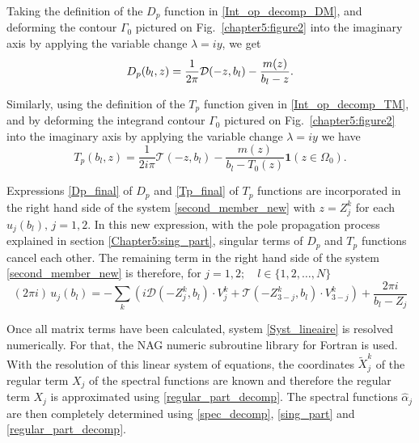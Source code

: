Taking the definition of the $D_p$ function in \eqref{Int_op_decomp_DM}, and deforming the contour $\Gamma_0$ pictured on Fig.~\ref{chapter5:figure2} into the imaginary axis by applying the variable change $\lambda = iy$, we get
\begin{equation}
\label{Dp_final}
D_p(b_l,z) = {1\over 2\pi}\mathcal D(-z,b_l)-  {m(z)\over b_l-z}.
\end{equation}

Similarly, using the definition of the $T_p$ function given in \eqref{Int_op_decomp_TM}, and by deforming the integrand contour $\Gamma_0$ pictured on Fig.~\ref{chapter5:figure2} into the imaginary axis by applying the variable change $\lambda = iy$ we have
\begin{equation}
\label{Tp_final}
T_p(b_l,z) = 
\dfrac{1}{2i\pi} \mathcal T(-z,b_l) - \dfrac{m(z)}{b_l - T_0(z)} \mathbf{1} (z \in \Omega_0) .
\end{equation}

Expressions \eqref{Dp_final} of $D_p$ and \eqref{Tp_final} of $T_p$ functions are incorporated in the right hand side of the system \eqref{second_member_new} with $z = Z_j^k$ for each $u_j(b_l), \, j=1,2$. In this new expression, with the pole propagation process explained in section \ref{Chapter5:sing_part}, singular terms of $D_p$ and $T_p$ functions cancel each other. The remaining term in the right hand side of the system \eqref{second_member_new} is therefore, for $j=1,2; \quad l \in \{ 1,2, \ldots, N \}$
\begin{equation}
(2\pi i) \, u_j(b_l) =  - \sum_k \left( i \mathcal D(-Z_j^k,b_l)\cdot V_j^k  + \mathcal T(-Z_{3-j}^k,b_l) 
\cdot V_{3-j}^k  \right) +  \dfrac{2\pi i}{b_l - Z_j}
\end{equation}

Once all matrix terms have been calculated, system \eqref{Syst_lineaire} is resolved numerically. For that, the NAG numeric subroutine library for Fortran is used. With the resolution of this linear system of equations, the coordinates $\tilde{X}_j^k$ of the regular term $X_j$ of the spectral functions are known and therefore the regular term $X_j$ is approximated using \eqref{regular_part_decomp}. The spectral functions $\hat{\alpha}_j$ are then completely determined using \eqref{spec_decomp}, \eqref{sing_part} and \eqref{regular_part_decomp}. 

